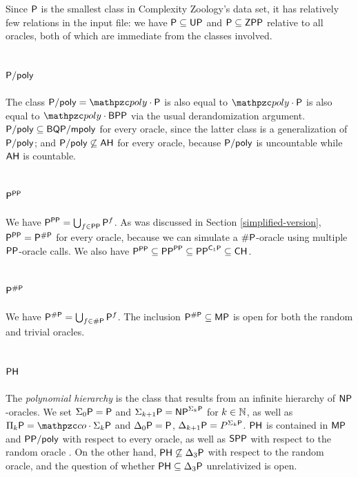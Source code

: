 Since $\mathsf{P}$ is the smallest class in Complexity Zoology's data set, it has 
relatively few relations in the input file: we have $\mathsf{P}\subseteq\mathsf{UP}$ and 
$\mathsf{P}\subseteq\mathsf{ZPP}$ relative to all oracles, both of which are immediate 
from the classes involved.

\subsection{$\mathsf{P}/\mathsf{poly}$}

The class $\sP/\poly=\cpoly\cdot\sP$ is also equal to $\cpoly\cdot\sP$ is also 
equal to $\cpoly\cdot\msf{BPP}$ via the usual derandomization argument. 
$\mathsf{P}/\mathsf{poly}\subseteq\mathsf{BQP}/\mathsf{mpoly}$ for every oracle, since the latter 
class is a generalization of $\mathsf{P}/\mathsf{poly}$; and $\mathsf{P}/\mathsf{poly}\not\subseteq\mathsf{AH}$ 
for every oracle, because $\mathsf{P}/\mathsf{poly}$ is uncountable while $\mathsf{AH}$ is 
countable.

\subsection{$\mathsf{P}^{\mathsf{PP}}$}

We have $\mathsf{P}^{\mathsf{PP}}=\bigcup_{f\in\mathsf{PP}}\mathsf{P}^f$. As was discussed in 
Section \ref{simplified-version}, $\mathsf{P}^{\mathsf{PP}}=\mathsf{P}^{\#\mathsf{P}}$ for every oracle,
because we can simulate a $\#\mathsf{P}$-oracle using multiple $\mathsf{PP}$-oracle calls.
We also have $\mathsf{P}^{\mathsf{PP}}\subseteq\mathsf{PP}^{\mathsf{PP}}\subseteq\mathsf{PP}^{\mathsf{
C}_1\mathsf{P}}\subseteq\mathsf{CH}$.

\subsection{$\mathsf{P}^{\#\mathsf{P}}$}

We have $\mathsf{P}^{\#\mathsf{P}}=\bigcup_{f\in\#\mathsf{P}}\mathsf{P}^f$. The inclusion 
$\mathsf{P}^{\#\mathsf{P}}\subseteq\mathsf{MP}$ is open for both the random and trivial oracles.

\subsection{$\mathsf{PH}$}

The \textit{polynomial hierarchy} is the class that results from an infinite 
hierarchy of $\mathsf{NP}$-oracles. We set $\Sigma_0\mathsf{P}=\mathsf{P}$ and 
$\Sigma_{k+1}\mathsf{P}=\mathsf{NP}^{\Sigma_k\mathsf{P}}$ for $k\in\mathbb{N}$, as well as 
$\Pi_k\sP=\cco\cdot\Sigma_k\sP$ and $\Delta_0\mathsf{P}=\mathsf{P}$, 
$\Delta_{k+1}\mathsf{P}=P^{\Sigma_k\mathsf{P}}$. $\mathsf{PH}$ is contained in $\mathsf{MP}$ 
\cite{green1995power} and $\mathsf{PP}/\mathsf{poly}$ with respect to every oracle, as well
as $\mathsf{SPP}$ with respect to the random oracle \cite{fortnow1999relativized}. 
On the other hand, $\mathsf{PH}\not\subseteq\Delta_3\mathsf{P}$ with respect to the random
oracle, and the question of whether $\mathsf{PH}\subseteq\Delta_3\mathsf{P}$ unrelativized
is open.

